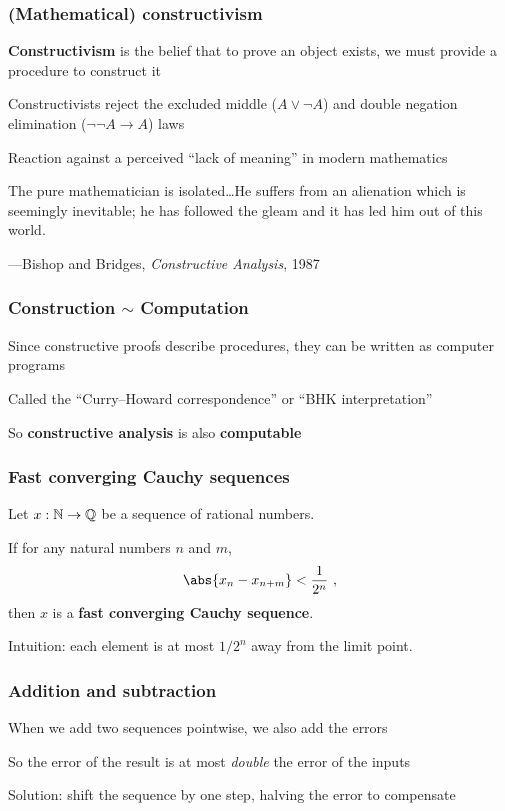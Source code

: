 \documentclass{beamer}
\begin{document}
\begin{frame}
    \frametitle{(Mathematical) constructivism}

    \textbf{Constructivism} is the belief that to prove an object exists, we must provide a procedure to construct it

    Constructivists reject the excluded middle ($A \vee \neg A$) and double negation elimination ($\neg\neg A \rightarrow A$) laws

    Reaction against a perceived ``lack of meaning'' in modern mathematics
\end{frame}

\begin{frame}
    The pure mathematician is isolated\dots He suffers from an alienation which is seemingly inevitable; he has followed the gleam and it has led him out of this world.

    \hfill ---Bishop and Bridges, \textit{Constructive Analysis}, 1987
\end{frame}

\begin{frame}
    \frametitle{Construction $\sim$ Computation}

    Since constructive proofs describe procedures, they can be written as computer programs

    Called the ``Curry--Howard correspondence'' or ``BHK interpretation''

    So \textbf{constructive analysis} is also \textbf{computable}
\end{frame}

\begin{frame}
    \frametitle{Fast converging Cauchy sequences}
    \begin{Definition}
        Let $x : \mathbb{N} \rightarrow \mathbb{Q}$ be a sequence of rational numbers.

        If for any natural numbers $n$ and $m$,
        \[
            \abs{x_n - x_{n+m}} < \frac 1 {2^n} \ ,
        \]
        then $x$ is a \textbf{fast converging Cauchy sequence}.
    \end{Definition}

    Intuition: each element is at most $1/2^n$ away from the limit point.
\end{frame}

\begin{frame}
    \frametitle{Addition and subtraction}

    When we add two sequences pointwise, we also add the errors

    So the error of the result is at most \emph{double} the error of the inputs

    Solution: shift the sequence by one step, halving the error to compensate
\end{frame}
\end{document}
